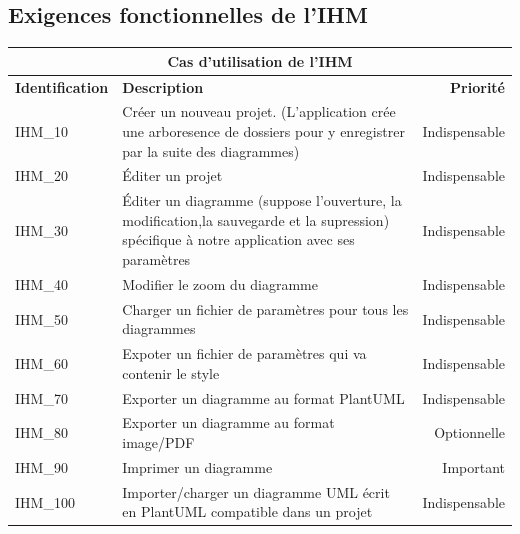 \documentclass[hidelinks, 10pt,a4paper]{article}
\begin{document}
\subsection{Exigences fonctionnelles de l'IHM}
\begin{center}
    \begin{tabular}{|l|p{8cm}|r|}
        \hline\multicolumn{3}{|c|}{Cas d’utilisation de l'IHM} \\\hline
        {\textbf{Identification}} & {\textbf{Description}} & {\textbf{Priorité}} \\\hline
        {IHM\_10} & {Créer un nouveau projet. (L’application crée une arboresence de dossiers pour y enregistrer par la suite des diagrammes)} & {Indispensable} \\\hline
        {IHM\_20} & {Éditer un projet} & {Indispensable} \\\hline
        {IHM\_30} & {Éditer un diagramme (suppose l’ouverture, la modification,la sauvegarde et la supression) spécifique à notre application avec ses paramètres} & {Indispensable} \\\hline
        {IHM\_40} & {Modifier le zoom du diagramme} & {Indispensable} \\\hline
        {IHM\_50} & {Charger un fichier de paramètres pour tous les diagrammes} & {Indispensable} \\\hline
        {IHM\_60} & {Expoter un fichier de paramètres qui va contenir le style} & {Indispensable} \\\hline
        {IHM\_70} & {Exporter un diagramme au format PlantUML} & {Indispensable} \\\hline
        {IHM\_80} & {Exporter un diagramme au format image/PDF} & {Optionnelle} \\\hline
        {IHM\_90} & {Imprimer un diagramme} & {Important} \\\hline
        {IHM\_100} & {Importer/charger un diagramme UML écrit en PlantUML compatible dans un projet} & {Indispensable} \\\hline
    \end{tabular}
\end{center}
\end{document}
